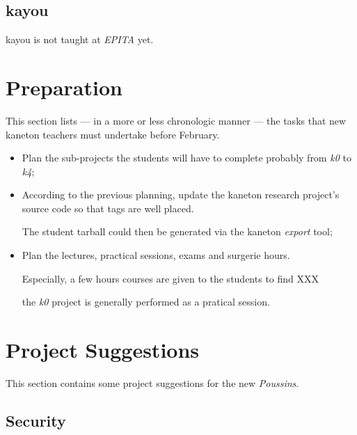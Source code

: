 \begin{multicols}{2}
%
%

\subsection{kayou}

kayou is not taught at \textit{EPITA} yet.

%
%

\section{Preparation}

This section lists --- in a more or less chronologic manner --- the tasks that
new kaneton teachers must undertake before February.

\begin{itemize}
  \item
    Plan the sub-projects the students will have to complete probably from
    \textit{k0} to \textit{k4};
  \item
    According to the previous planning, update the kaneton research project's
    source code so that tags are well placed.

    \-

    The student tarball could then be generated via the kaneton
    \textit{export} tool;
  \item
    Plan the lectures, practical sessions, exams and surgerie hours.

    \-

    Especially, a few hours courses are given to the students to find XXX

the \textit{k0} project is generally performed as a pratical
    session.
\end{itemize}

%
%

\section{Project Suggestions}

This section contains some project suggestions for the new \textit{Poussins}.

%
%

\subsection{Security}


\end{multicols}
